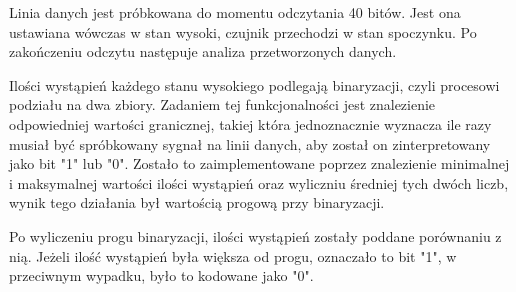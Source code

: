 Linia danych jest próbkowana do momentu odczytania 40 bitów. Jest ona ustawiana wówczas w stan wysoki, czujnik przechodzi w stan spoczynku. Po zakończeniu odczytu następuje analiza przetworzonych danych.

Ilości wystąpień każdego stanu wysokiego podlegają binaryzacji, czyli procesowi podziału na dwa zbiory. Zadaniem tej funkcjonalności jest znalezienie odpowiedniej wartości granicznej, takiej która jednoznacznie wyznacza ile razy musiał być spróbkowany sygnał na linii danych, aby został on zinterpretowany jako bit "1" lub "0". Zostało to zaimplementowane poprzez znalezienie minimalnej i maksymalnej wartości ilości wystąpień oraz wyliczniu średniej tych dwóch liczb, wynik tego działania był wartością progową przy binaryzacji.

Po wyliczeniu progu binaryzacji, ilości wystąpień zostały poddane porównaniu z nią. Jeżeli ilość wystąpień była większa od progu, oznaczało to bit "1", w przeciwnym wypadku, było to kodowane jako "0". 
